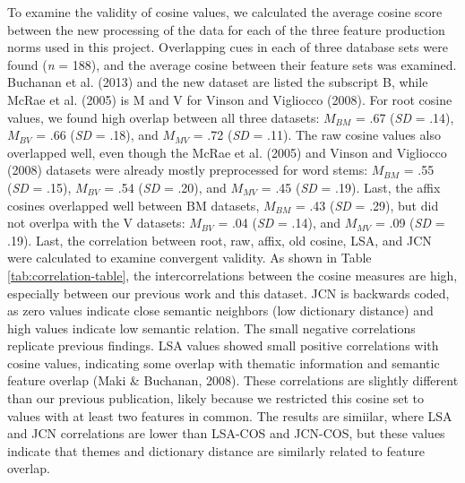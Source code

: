 \documentclass[english,man]{apa6}
\theoremstyle{definition}
\theoremstyle{definition}
\theoremstyle{definition}
\theoremstyle{remark}
\begin{document}
To examine the validity of cosine values, we calculated the average
cosine score between the new processing of the data for each of the
three feature production norms used in this project. Overlapping cues in
each of three database sets were found (\emph{n} = 188), and the average
cosine between their feature sets was examined. Buchanan et al. (2013)
and the new dataset are listed the subscript B, while McRae et al.
(2005) is M and V for Vinson and Vigliocco (2008). For root cosine
values, we found high overlap between all three datasets: \(M_{BM}\) =
.67 (\emph{SD} = .14), \(M_{BV}\) = .66 (\emph{SD} = .18), and
\(M_{MV}\) = .72 (\emph{SD} = .11). The raw cosine values also
overlapped well, even though the McRae et al. (2005) and Vinson and
Vigliocco (2008) datasets were already mostly preprocessed for word
stems: \(M_{BM}\) = .55 (\emph{SD} = .15), \(M_{BV}\) = .54 (\emph{SD} =
.20), and \(M_{MV}\) = .45 (\emph{SD} = .19). Last, the affix cosines
overlapped well between BM datasets, \(M_{BM}\) = .43 (\emph{SD} = .29),
but did not overlpa with the V datasets: \(M_{BV}\) = .04 (\emph{SD} =
.14), and \(M_{MV}\) = .09 (\emph{SD} = .19). Last, the correlation
between root, raw, affix, old cosine, LSA, and JCN were calculated to
examine convergent validity. As shown in Table
\ref{tab:correlation-table}, the intercorrelations between the cosine
measures are high, especially between our previous work and this
dataset. JCN is backwards coded, as zero values indicate close semantic
neighbors (low dictionary distance) and high values indicate low
semantic relation. The small negative correlations replicate previous
findings. LSA values showed small positive correlations with cosine
values, indicating some overlap with thematic information and semantic
feature overlap (Maki \& Buchanan, 2008). These correlations are
slightly different than our previous publication, likely because we
restricted this cosine set to values with at least two features in
common. The results are simiilar, where LSA and JCN correlations are
lower than LSA-COS and JCN-COS, but these values indicate that themes
and dictionary distance are similarly related to feature overlap.
\end{document}
